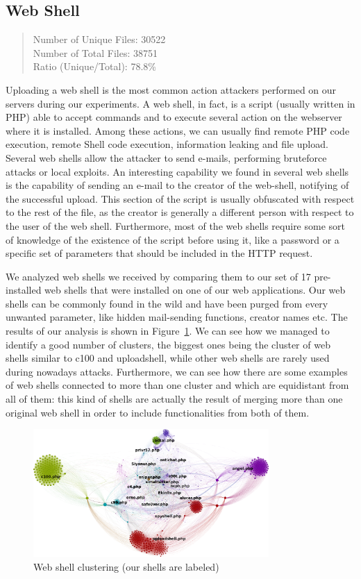 \subsection{Web Shell}

\begin{quote}
Number of Unique Files: 30522\\
Number of Total Files: 38751\\
Ratio (Unique/Total): 78.8\%
\end{quote}

Uploading a web shell is the most common action attackers performed on our servers during our experiments. A web shell, in fact, is a script (usually written in PHP) able to accept commands and to execute several action on the webserver where it is installed. Among these actions, we can usually find remote PHP code execution, remote Shell code execution, information leaking and file upload. Several web shells allow the attacker to send e-mails, performing bruteforce attacks or local exploits. An interesting capability we found in several web shells is the capability of sending an e-mail to the creator of the web-shell, notifying of the successful upload. This section of the script is usually obfuscated with respect to the rest of the file, as the creator is generally a different person with respect to the user of the web shell. Furthermore, most of the web shells require some sort of knowledge of the existence of the script before using it, like a password or a specific set of parameters that should be included in the HTTP request.

We analyzed web shells we received by comparing them to our set of 17 pre-installed web shells that were installed on one of our web applications. Our web shells can be commonly found in the wild and have been purged from every unwanted parameter, like hidden mail-sending functions, creator names etc. The results of our analysis is shown in Figure~\ref{fig:shellsClusters}. We can see how we managed to identify a good number of clusters, the biggest ones being the cluster of web shells similar to c100 and uploadshell, while other web shells are rarely used during nowadays attacks.
Furthermore, we can see how there are some examples of web shells connected to more than one cluster and which are equidistant from all of them: this kind of shells are actually the result of merging more than one original web shell in order to include functionalities from both of them.


\begin{figure}[H]
\centerline{\includegraphics[width=0.8\textwidth]{Images/shellsClusters.png}}
\caption{Web shell clustering (our shells are labeled)\label{fig:shellsClusters}}
\end{figure}
